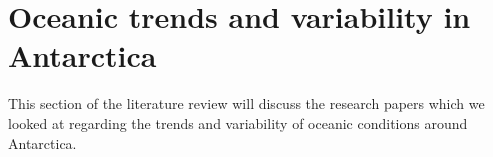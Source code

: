\documentclass[../main.tex]{subfiles}
\begin{document}
\section{Oceanic trends and variability in Antarctica}
This section of the literature review will discuss the research papers which we looked at regarding the trends and variability of oceanic conditions around Antarctica.
\end{document}
